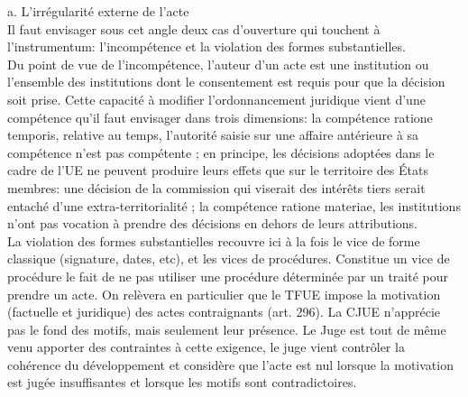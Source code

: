 \documentclass[10pt, a4paper, openany]{book}
\begin{document}
a. L'irrégularité externe de l'acte \\
Il faut envisager sous cet angle deux cas d'ouverture qui touchent à l'instrumentum: l'incompétence et la violation des formes substantielles. \\
Du point de vue de l'incompétence, l'auteur d'un acte est une institution ou l'ensemble des institutions dont le consentement est requis pour que la décision soit prise. Cette capacité à modifier l'ordonnancement juridique vient d'une compétence qu'il faut envisager dans trois dimensions: la compétence ratione temporis, relative au temps, l'autorité saisie sur une affaire antérieure à sa compétence n'est pas compétente ; en principe, les décisions adoptées dans le cadre de l'UE ne peuvent produire leurs effets que sur le territoire des États membres: une décision de la commission qui viserait des intérêts tiers serait entaché d'une extra-territorialité ; la compétence ratione materiae, les institutions n'ont pas vocation à prendre des décisions en dehors de leurs attributions. \\
La violation des formes substantielles recouvre ici à la fois le vice de forme classique (signature, dates, etc), et les vices de procédures. Constitue un vice de procédure le fait de ne pas utiliser une procédure déterminée par un traité pour prendre un acte. On relèvera en particulier que le TFUE impose la motivation (factuelle et juridique) des actes contraignants (art. 296). La CJUE n'apprécie pas le fond des motifs, mais seulement leur présence. Le Juge est tout de même venu apporter des contraintes à cette exigence, le juge vient contrôler la cohérence du développement et considère que l'acte est nul lorsque la motivation est jugée insuffisantes et lorsque les motifs sont contradictoires.
\end{document}
